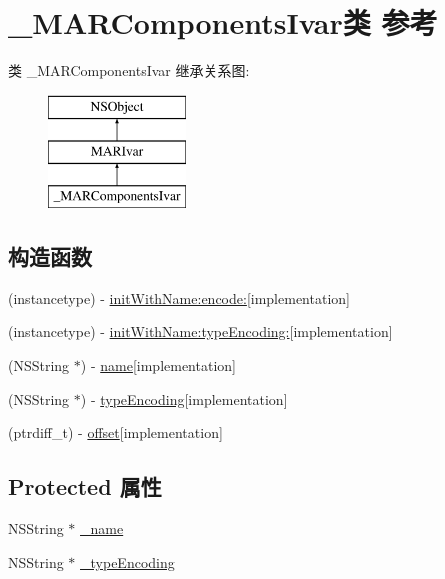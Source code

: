 \hypertarget{interface___m_a_r_components_ivar}{}\section{\+\_\+\+M\+A\+R\+Components\+Ivar类 参考}
\label{interface___m_a_r_components_ivar}
类 \+\_\+\+M\+A\+R\+Components\+Ivar 继承关系图\+:\begin{figure}[H]
\begin{center}
\leavevmode
\includegraphics[height=3.000000cm]{interface___m_a_r_components_ivar}
\end{center}
\end{figure}
\subsection*{构造函数}
\begin{DoxyCompactItemize}
\item 
(instancetype) -\/ \hyperlink{interface___m_a_r_components_ivar_ac6e9bd2ac3da97f90cd00a54132f182f}{init\+With\+Name\+:encode\+:}{\ttfamily  \mbox{[}implementation\mbox{]}}
\item 
(instancetype) -\/ \hyperlink{interface___m_a_r_components_ivar_a191697e16f4a9d4c2aca202ce702b959}{init\+With\+Name\+:type\+Encoding\+:}{\ttfamily  \mbox{[}implementation\mbox{]}}
\item 
(N\+S\+String $\ast$) -\/ \hyperlink{interface___m_a_r_components_ivar_ab0c07ae9b4db51465fa12aba2990698b}{name}{\ttfamily  \mbox{[}implementation\mbox{]}}
\item 
(N\+S\+String $\ast$) -\/ \hyperlink{interface___m_a_r_components_ivar_acccf7268cb3cbc4c1d9f679525027ece}{type\+Encoding}{\ttfamily  \mbox{[}implementation\mbox{]}}
\item 
(ptrdiff\+\_\+t) -\/ \hyperlink{interface___m_a_r_components_ivar_a116ec6be5840f75905da30dce18ac227}{offset}{\ttfamily  \mbox{[}implementation\mbox{]}}
\end{DoxyCompactItemize}
\subsection*{Protected 属性}
\begin{DoxyCompactItemize}
\item 
N\+S\+String $\ast$ \hyperlink{interface___m_a_r_components_ivar_a82d62b49a7942c2c795d9e7d5429d313}{\+\_\+name}
\item 
N\+S\+String $\ast$ \hyperlink{interface___m_a_r_components_ivar_a0a66023397cedf45405fc9dae581c9f3}{\+\_\+type\+Encoding}
\end{DoxyCompactItemize}
